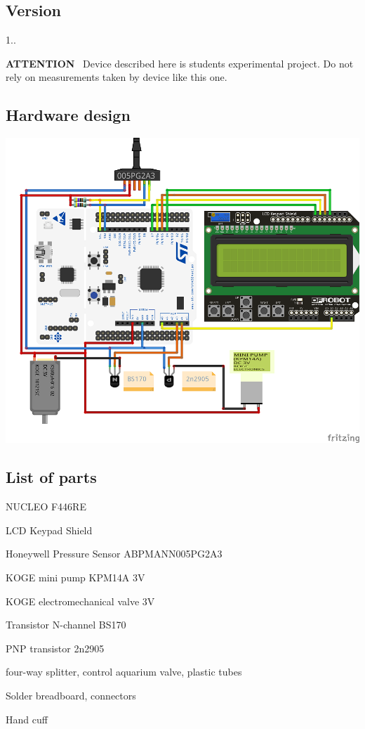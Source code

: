 \subsection*{Version}

1..

{\bfseries{A\+T\+T\+E\+N\+T\+I\+ON}}~\newline
 Device described here is student\textquotesingle{}s experimental project. Do not rely on measurements taken by device like this one.

\subsection*{Hardware design}


\begin{DoxyImage}
\includegraphics[width=\textwidth,height=\textheight/2,keepaspectratio=true]{BloodPressureMeter_png.png}
\end{DoxyImage}


\subsection*{List of parts}


\begin{DoxyItemize}
\item N\+U\+C\+L\+EO F446\+RE
\item L\+CD Keypad Shield
\item Honeywell Pressure Sensor A\+B\+P\+M\+A\+N\+N005\+P\+G2\+A3
\item K\+O\+GE mini pump K\+P\+M14A 3V
\item K\+O\+GE electromechanical valve 3V
\item Transistor N-\/channel B\+S170
\item P\+NP transistor 2n2905
\item four-\/way splitter, control aquarium valve, plastic tubes
\item Solder breadboard, connectors
\item Hand cuff
\end{DoxyItemize}

